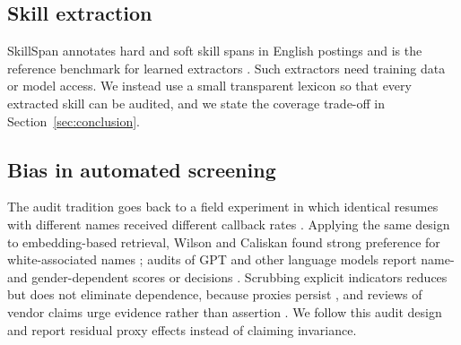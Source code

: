 \subsection{Skill extraction}
SkillSpan annotates hard and soft skill spans in English postings and is the reference benchmark for
learned extractors \cite{zhang2022skillspan}. Such extractors need training data or model access. We instead use a
small transparent lexicon so that every extracted skill can be audited, and we state the coverage trade-off in
Section~\ref{sec:conclusion}.

\subsection{Bias in automated screening}
The audit tradition goes back to a field experiment in which identical resumes with different names
received different callback rates \cite{bertrand2004emily}. Applying the same design to embedding-based
retrieval, Wilson and Caliskan found strong preference for white-associated names \cite{wilson2024silicon};
audits of GPT and other language models report name- and gender-dependent scores or decisions
\cite{armstrong2024silicon,an2024discriminate,wang2024jobfair}. Scrubbing explicit indicators
reduces but does not eliminate dependence, because proxies persist \cite{dearteaga2019biasinbios,gonen2019lipstick},
and reviews of vendor claims urge evidence rather than assertion \cite{raghavan2020mitigating}. We follow this
audit design and report residual proxy effects instead of claiming invariance.
